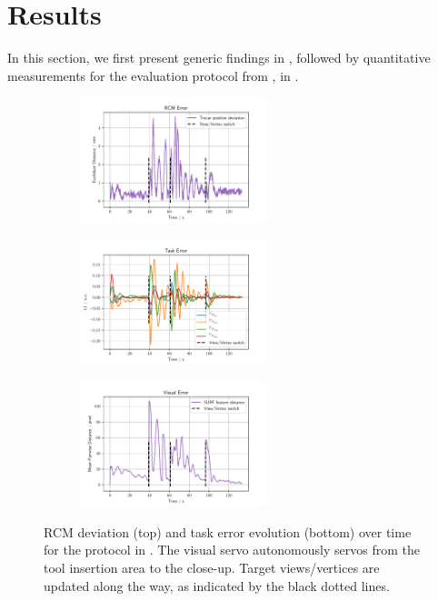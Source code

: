 \section{Results}
\label{c2:sec:results}
In this section, we first present generic findings in , followed by quantitative measurements for the evaluation protocol from , in .
\begin{figure}
\centering
\begin{subfigure}[b]{\textwidth}
    \centering
    \includegraphics[width=0.6\textwidth]{fig/rcm_error.pdf}
\end{subfigure}
\begin{subfigure}[b]{\textwidth}
    \centering
    \includegraphics[width=0.6\textwidth]{fig/task_error.pdf}
\end{subfigure}
\begin{subfigure}[b]{\textwidth}
\centering
\includegraphics[width=0.6\textwidth]{fig/visual_error.pdf}
\end{subfigure}
\caption{RCM deviation (top) and task error evolution (bottom) over time for the protocol in . The visual servo autonomously servos from the tool insertion area to the close-up. Target views/vertices are updated along the way, as indicated by the black dotted lines.}
\label{c2:fig:errors}
\end{figure}
